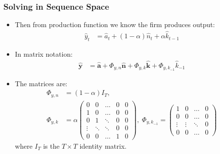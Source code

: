 \documentclass[english,xcolor=svgnames]{beamer}
\begin{document}
\begin{frame}
    \frametitle{Solving in Sequence Space}
		\begin{itemize}
			\item Then from production function we know the firm produces output:
			\begin{align*}
				\hat{y}_t&=\hat{a}_t + (1-\alpha)\hat{n}_{t} +\alpha \hat{k}_{t-1} 
			\end{align*}
			\item In matrix notation:
			\begin{align*}
				\mathbf{\hat{y}} &= \mathbf{\hat{a}} + \Phi_{y,n}\mathbf{\hat{n}} + \Phi_{y,k}\mathbf{\hat{k}} + \Phi_{y,k_{-1}}\hat{k}_{-1}
			\end{align*}
			\item The matrices are:
			\begin{align*}
				\Phi_{y,n}&=(1-\alpha)I_T,\\ \Phi_{y,k}&=\alpha \begin{pmatrix} 
					0 & 0 & \hdots & 0 & 0 \\
					1 & 0 & \hdots & 0 & 0 \\
					0 & 1 & \ddots & 0 & 0 \\
					\vdots & \ddots & \ddots & 0 & 0 \\
					0 & 0 & \hdots & 1 & 0
				\end{pmatrix},\; 
				\Phi_{y,k_{-1}}=\begin{pmatrix}
					1 & 0 & \hdots & 0 \\
					0 & 0 & \hdots & 0 \\
					\vdots & \vdots & \ddots & 0 \\
					0 & 0 & \hdots & 0
				\end{pmatrix}
			\end{align*}
			where $I_T$ is the $T\times T$ identity matrix.
		\end{itemize}
\end{frame}
\end{document}
